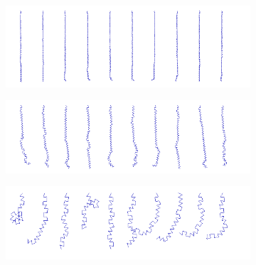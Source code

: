 \documentclass[sigplan,screen,nonacm]{acmart}
\begin{document}
\begin{figure}
    \caption{Different distance and particle pairing definitions yield
    significantly different results. Particle masses were slightly randomized
    for a variance between strands. In each below simulation, $nr_{seg}$
    particles of length $l_{seg}$ were generated. Distance constraints acting as
    bending constraints had a stiffness parameter $k$. Distance
    constraints responsible for keeping the particles $l_{seg}$ distance apart
    always had a $k_{pos}=1$ stiffness parameter.}
    \label{fig:bendingConstraint}
    \begin{subfigure}{.5\linewidth}
        \caption{}
        \includegraphics[width=\linewidth]{bend_con_10Sim_120Seg_0.005lSeg.png}
    \end{subfigure}%
    \begin{subfigure}{.5\linewidth}
        \caption{}
    \includegraphics[width=\linewidth]{bend_con_10Sim_60Seg_0.01lSeg.png}
    \end{subfigure}%
    \par\medskip
    \begin{subfigure}{.5\linewidth}
        \caption{}
    \includegraphics[width=\linewidth]{bend_con_10Sim_30Seg_0.02lSeg.png}

\end{subfigure}
\end{figure}
\end{document}
